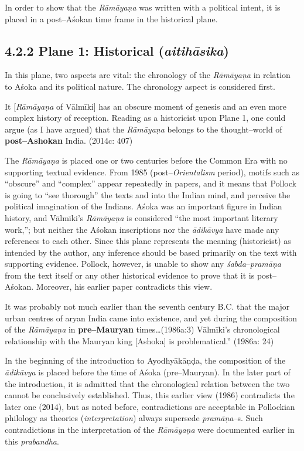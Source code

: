 In order to show that the \textit{Rāmāyaṇa} was written with a political intent, it is placed in a post–Aśokan time frame in the historical plane.


\subsection*{4.2.2 Plane 1: Historical ({\it {\bfseries aitihāsika}})}

In this plane, two aspects are vital: the chronology of the \textit{Rāmāyaṇa} in relation to Aśoka and its political nature. The chronology aspect is considered first.

\begin{myquote}
It [\textit{Rāmāyaṇa} of Vālmīki] has an obscure moment of genesis and an even more complex history of reception. Reading as a historicist upon Plane 1, one could argue (as I have argued) that the \textit{Rāmāyaṇa} belongs to the thought–world of \textbf{post–Ashokan} India. (2014c: 407)
\end{myquote}

The \textit{Rāmāyaṇa} is placed one or two centuries before the Common Era with no supporting textual evidence. From 1985 (post–\textit{Orientalism} period), motifs such as “obscure” and “complex” appear repeatedly in papers, and it means that Pollock is going to “see thorough” the texts and into the Indian mind, and perceive the political imagination of the Indians. Aśoka was an important figure in Indian history, and Vālmīki’s \textit{Rāmāyaṇa }is considered “the most important literary work,”; but neither the Aśokan inscriptions nor the \textit{ādikāvya} have made any references to each other. Since this plane represents the meaning (historicist) as intended by the author, any inference should be based primarily on the text with supporting evidence. Pollock, however, is unable to show any\textit{ śabda}–\textit{pramāṇa} from the text itself or any other historical evidence to prove that it is post–Aśokan. Moreover, his earlier paper contradicts this view.

\begin{myquote}
It was probably not much earlier than the seventh century B.C. that the major urban centres of aryan India came into existence, and yet during the composition of the \textit{Rāmāyaṇa} in \textbf{pre–Mauryan} times…(1986a:3) Vālmīki’s chronological relationship with the Mauryan king [Ashoka] is problematical.” (1986a: 24)
\end{myquote}

In the beginning of the introduction to Ayodhyākāṇḍa, the composition of the \textit{ādikāvya} is placed before the time of Aśoka (pre–Mauryan). In the later part of the introduction, it is admitted that the chronological relation between the two cannot be conclusively established. Thus, this earlier view (1986) contradicts the later one (2014), but as noted before, contradictions are acceptable in Pollockian philology as theories (\textit{interpretation}) always supersede \textit{pramāṇa}–s. Such contradictions in the interpretation of the \textit{Rāmāyaṇa} were documented earlier in this \textit{prabandha}.

